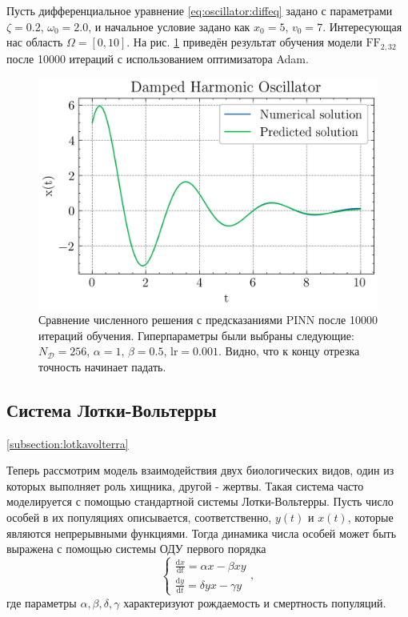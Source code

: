 \documentclass[a4paper, 12pt]{article}
\begin{document}
Пусть дифференциальное уравнение \ref{eq:oscillator:diffeq} задано с параметрами $\zeta = 0.2$, $\omega_0 = 2.0$, и начальное условие задано как $x_0 = 5$, $v_0 = 7$. Интересующая нас область $\Omega = [0, 10]$. На рис. \ref{fig:oscillator:solution} приведён результат обучения модели $\mathrm{FF}_{2, 32}$ после 10000 итераций с использованием оптимизатора Adam.

\begin{figure}
    \centering
    \includegraphics{../Differential Equation Solution/images/oscillator/Damped Harmonic Oscillator.png}
    \caption{Сравнение численного решения с предсказаниями PINN после 10000 итераций обучения. Гиперпараметры были выбраны следующие: $N_\mathcal{D} = 256$, $\alpha = 1$, $\beta = 0.5$, $\mathrm{lr} = 0.001$. Видно, что к концу отрезка точность начинает падать.}
    \label{fig:oscillator:solution}
\end{figure}

\subsection{Система Лотки-Вольтерры} \ref{subsection:lotkavolterra}

Теперь рассмотрим модель взаимодействия двух биологических видов, один из которых выполняет роль хищника, другой - жертвы. Такая система часто моделируется с помощью стандартной системы Лотки-Вольтерры. Пусть число особей в их популяциях описывается, соответственно, $y(t)$ и $x(t)$, которые являются непрерывными функциями. Тогда динамика числа особей может быть выражена с помощью системы ОДУ первого порядка
\begin{equation} \label{eq:lotkavolterra:diffeq}
\begin{cases}
    \frac{\mathrm{d}x}{\mathrm{d}t} = \alpha x - \beta x y \\
    \frac{\mathrm{d}y}{\mathrm{d}t} = \delta y x - \gamma y
\end{cases},
\end{equation}
где параметры $\alpha, \beta, \delta, \gamma$ характеризуют рождаемость и смертность популяций.
\end{document}

